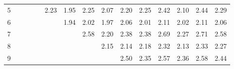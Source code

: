 \documentclass[a3paper,extrafontsizes,20pt, ngerman]{memoir}
\begin{document}
\begin{figure}
\begin{tabular}{c|cccccccccccccc}
        5                    &                                  &                                  &                                  &                                  & \textcolor[HTML]{ 91206d }{2.23} & \textcolor[HTML]{ 70208e }{1.95} & \textcolor[HTML]{ 93206b }{2.25} & \textcolor[HTML]{ 7e2080 }{2.07} & \textcolor[HTML]{ 8d2071 }{2.20} & \textcolor[HTML]{ 93206b }{2.25} & \textcolor[HTML]{ a72057 }{2.42} & \textcolor[HTML]{ 82207c }{2.10} & \textcolor[HTML]{ a92055 }{2.44} & \textcolor[HTML]{ 982066 }{2.29} \\
        6                    &                                  &                                  &                                  &                                  &                                  & \textcolor[HTML]{ 6f208f }{1.94} & \textcolor[HTML]{ 782086 }{2.02} & \textcolor[HTML]{ 73208b }{1.97} & \textcolor[HTML]{ 7d2081 }{2.06} & \textcolor[HTML]{ 772087 }{2.01} & \textcolor[HTML]{ 82207c }{2.11} & \textcolor[HTML]{ 782086 }{2.02} & \textcolor[HTML]{ 83207b }{2.11} & \textcolor[HTML]{ 7d2081 }{2.06} \\
        7                    &                                  &                                  &                                  &                                  &                                  &                                  & \textcolor[HTML]{ ba2044 }{2.58} & \textcolor[HTML]{ 8d2071 }{2.20} & \textcolor[HTML]{ a3205b }{2.38} & \textcolor[HTML]{ a2205c }{2.38} & \textcolor[HTML]{ c72037 }{2.69} & \textcolor[HTML]{ 962068 }{2.27} & \textcolor[HTML]{ c92035 }{2.71} & \textcolor[HTML]{ ba2044 }{2.58} \\
        8                    &                                  &                                  &                                  &                                  &                                  &                                  &                                  & \textcolor[HTML]{ 872077 }{2.15} & \textcolor[HTML]{ 862078 }{2.14} & \textcolor[HTML]{ 8b2073 }{2.18} & \textcolor[HTML]{ 9b2063 }{2.32} & \textcolor[HTML]{ 852079 }{2.13} & \textcolor[HTML]{ 9c2062 }{2.33} & \textcolor[HTML]{ 952069 }{2.27} \\
        9                    &                                  &                                  &                                  &                                  &                                  &                                  &                                  &                                  & \textcolor[HTML]{ b0204e }{2.50} & \textcolor[HTML]{ 9f205f }{2.35} & \textcolor[HTML]{ b92045 }{2.57} & \textcolor[HTML]{ a0205e }{2.36} & \textcolor[HTML]{ ba2044 }{2.58} & \textcolor[HTML]{ aa2054 }{2.44} \\

\end{tabular}
\end{figure}
\end{document}
